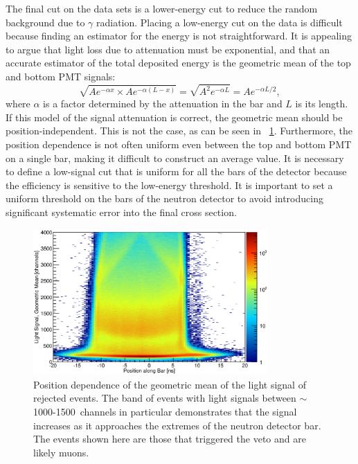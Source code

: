 The final cut on the data sets is a lower-energy cut to reduce the random background due to $\gamma$ radiation.  Placing a low-energy cut on the data is difficult because finding an estimator for the energy is not straightforward.  It is appealing to argue that light loss due to attenuation must be exponential, and that an accurate estimator of the total deposited energy is the geometric mean of the top and bottom PMT signals:
\begin{equation}
\sqrt{Ae^{-\alpha x}\times Ae^{-\alpha (L-x)}} = \sqrt{A^2e^{-\alpha L}} = Ae^{-\alpha L/2},
\end{equation}
where $\alpha$ is a factor determined by the attenuation in the bar and $L$ is its length.  If this model of the signal attenuation is correct, the geometric mean should be position-independent.  This is not the case, as can be seen in {\fig}~\ref{fig:product_positionDependence}.  Furthermore, the position dependence is not often uniform even between the top and bottom PMT on a single bar, making it difficult to construct an average value.  It is necessary to define a low-signal cut that is uniform for all the bars of the detector because the efficiency is sensitive to the low-energy threshold.  It is important to set a uniform threshold on the bars of the neutron detector to avoid introducing significant systematic error into the final cross section.
\begin{figure}[!htbp]
\centering
\includegraphics[width=0.8\textwidth]{figures/positionVSenergy.eps}
\caption[Position dependence of the geometric mean of the light signal of rejected events.]{Position dependence of the geometric mean of the light signal of rejected events.  The band of events with light signals between $\sim$1000-1500~channels in particular demonstrates that the signal increases as it approaches the extremes of the neutron detector bar.  The events shown here are those that triggered the veto and are likely muons.}
\label{fig:product_positionDependence}
\end{figure}

